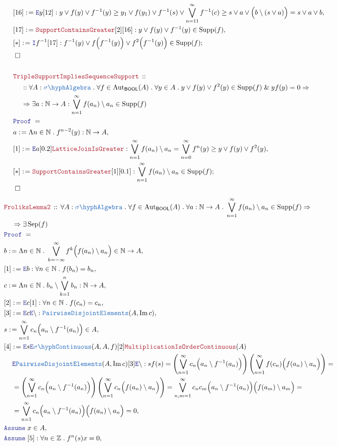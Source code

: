\documentclass[12pt]{scrartcl}
\newcommand{\TYPE}[1]{\textcolor{NavyBlue}{\mathtt{#1}}}
\newcommand{\LOGIC}[1]{\textcolor{Blue}{\mathtt{#1}}}
\newcommand{\THM}[1]{\textcolor{Maroon}{\mathtt{#1}}}
\renewcommand{\.}{\; . \;}
\newcommand{\de}{: \kern 0.1pc =}
\newcommand{\Theorem}[2]{& \THM{#1} \, :: \, #2 \\ & \Proof = \\ }
\newcommand{\NewLine}{\\ & \kern 1pc}
\newcommand{\Page}[1]{ \begin{align*} #1 \end{align*}   }
\renewcommand{\And}{\; \& \;}
\newcommand{\Imply}{\Rightarrow}
\newcommand{\Intro}{\LOGIC{I}}
\newcommand{\Elim}{\LOGIC{E}}
\newcommand{\Int}{\mathbb{Z} }
\newcommand{\Nat}{\mathbb{N} }
\DeclareMathOperator*{\im}{Im}
\newcommand{\Aut}{\mathrm{Aut}}
\newcommand{\Say}[3]{& #1 \de #2 : #3, \\}
\newcommand{\SayIn}[3]{& #1 \de #2 \in #3, \\}
\newcommand{\Conclude}[3]{& #1 \de #2 : #3; \\}
\newcommand{\Assume}[2]{& \LOGIC{Assume} \; #1 : #2, \\}
\newcommand{\AssumeIn}[2]{& \LOGIC{Assume} \; #1 \in #2, \\}
\newcommand{\QED}{\; \square}
\newcommand{\EndProof}{& \QED \\}
\newcommand{\Proof}{\LOGIC{Proof} \; }
\newcommand{\SA}{\TYPE{\sigma \hyph Algebra}}
\newcommand{\PD}{\TYPE{PairwiseDisjointElements}}
\newcommand{\sC}{\TYPE{\sigma\hyph Continuous}}
\DeclareMathOperator{\Supp}{Supp}
\DeclareMathOperator{\Sep}{Sep}
\newcommand{\BOOL}{\mathsf{BOOL}}
\begin{document}
\Page{
	\Say{[16]}{\Elim y [12]}
	{
		y \vee f(y) \vee f^{-1}(y) \ge
		y_1 \vee f(y_1) \vee f^{-1}(s) \vee \bigvee_{n =1 1}^\infty f^{-1}(c) \ge 
		s \vee a \vee \Big(b \setminus (s \vee a)\Big) = 
		s \vee a \vee b 	
	}
	\Say{[17]}{\THM{SupportContainsGreater}[2][16]}
	{
		y \vee f(y) \vee f^{-1}(y) \in \Supp(f)
	}
	\Conclude{[*]}{\Intro  f^{-1} [17]}
	{
		f^{-1}(y) \vee 
		f\Big( f^{-1}(y) \Big)
		\vee
		f^2\Big( f^{-1}(y) \Big) \in \Supp(f)
	}
	\EndProof
	\\
	\Theorem{TripleSupportImpliesSequenceSupport}
	{
		\NewLine ::
		\forall A : \SA \.
		\forall f \in \Aut_\BOOL(A) \.
		\forall y \in A \.
		y \vee f(y) \vee f^2(y) \in \Supp(f) 
		\And y f(y) = 0		
		\Imply \NewLine \Imply
		\exists a : \Nat \to A :
		\bigvee^\infty_{n=1} f(a_n) \setminus a_n \in \Supp(f)
	}
	\Say{a}{\Lambda n \in \Nat \. f^{n-2}(y)}{\Nat \to A}
	\Say{[1]}{\Elim a [0.2] \THM{LatticeJoinIsGreater}}
	{
		\bigvee^\infty_{n=1}  f(a_n) \setminus a_n = 
		\bigvee^\infty_{n=0} f^n(y)  \ge
		 y \vee f(y) \vee f^2(y)
	}
	\Conclude{[*]}{\THM{SupportContainsGreater}[1][0.1]}
	{
		\bigvee^\infty_{n=1} f(a_n) \setminus a_n \in \Supp(f) 
	}
	\EndProof
}\Page{
	\Theorem{FroliksLemma2}
	{
		\forall A : \SA \.
		\forall f \in \Aut_\BOOL(A) \.
		\forall a : \Nat \to A \.
		\bigvee^\infty_{n=1} f(a_n) \setminus a_n \in \Supp(f) 
		\Imply \NewLine \Imply 
		\exists \Sep(f)
	}
	\SayIn{b}{ 
		\Lambda n \in \Nat \. 
		\bigvee^\infty_{k=-\infty}  f^k\Big(f(a_n) \setminus a_n \Big)
		}
		{\Nat \to A}
	\Say{[1]}{\Elim b}{\forall n \in \Nat \. f(b_n) = b_n}
	\Say{c}{\Lambda n \in \Nat \. b_n \setminus \bigvee^n_{k=1} b_n}
	{
		\Nat \to A
	}
	\Say{[2]}{\Elim c [1]}{\forall n \in \Nat \. f(c_n) = c_n}
	\Say{[3]}{\Elim c \Elim \setminus }{\PD(A,\im c)}
	\SayIn{s}{ \bigvee_{n=1}^\infty c_n \Big(a_n \setminus f^{-1}(a_n) \Big)  }
	{
		A
	}
	\Say{[4]}{\Elim s \Elim \sC(A,A,f)
		[2]
		\THM{MultiplicationIsOrderContinuous}(A)
		\NewLine 
		\Elim \PD(A,\im c)[3]
		\Elim \setminus}
	{
		sf(s) =
		\left( \bigvee_{n=1}^\infty c_n \Big(a_n \setminus f^{-1}(a_n)\Big)\right)
		\left( \bigvee_{n=1}^\infty f(c_n) \Big(f(a_n) \setminus a_n\Big)\right) =
		\NewLine =
		\left( \bigvee_{n=1}^\infty c_n \Big(a_n \setminus f^{-1}(a_n)\Big)\right)
		\left( \bigvee_{n=1}^\infty c_n \Big(f(a_n) \setminus a_n\Big)\right) =
		\bigvee_{n,m=1}^\infty  c_n c_m  
		\Big(a_n \setminus f^{-1}(a_n)\Big) 
		\Big(f(a_m) \setminus a_m\Big) =  \NewLine =
		\bigvee_{n=1}^\infty c_n 
		\Big(a_n \setminus f^{-1}(a_n)\Big) 
		\Big(f(a_n) \setminus a_n\Big) =
		0
	}
	\AssumeIn{x}{A}
	\Assume{[5]}{\forall n \in \Int \. f^n(s)x = 0}
}
\end{document}
